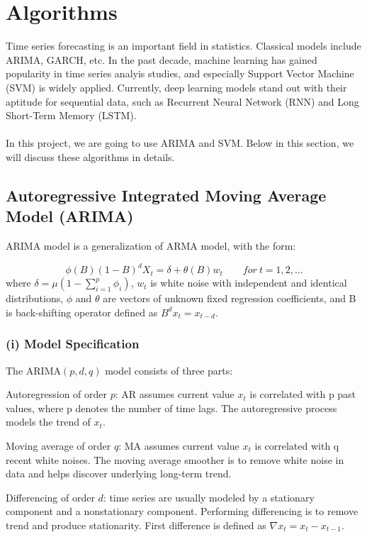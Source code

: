 \documentclass[11pt,a4paper]{article}
\begin{document}
\section{Algorithms}
Time series forecasting is an important field in statistics. Classical models include ARIMA, GARCH, etc. In the past decade, machine learning has gained popularity in time series analyis studies, and especially Support Vector Machine (SVM) is widely applied. Currently, deep learning models stand out with their aptitude for sequential data, such as Recurrent Neural Network (RNN) and Long Short-Term Memory (LSTM).
\\ \\
In this project, we are going to use ARIMA and SVM. Below in this section, we will discuss these algorithms in details.

\subsection*{Autoregressive Integrated Moving Average Model (ARIMA)}
ARIMA model is a generalization of ARMA model, with the form:

$$\phi(B)(1-B)^dX_t=\delta+\theta(B)w_t  \qquad for ~ t = 1,2,…$$
where $\delta = \mu(1-\sum_{i=1}^{p}\phi_i)$, $w_t$ is white noise with independent and identical distributions, $\phi$ and $\theta$ are vectors of unknown fixed regression coefficients, and B is back-shifting operator defined as $B^dx_t=x_{t-d}$.

\subsubsection*{(i) Model Specification}
The ARIMA$(p,d,q)$ model consists of three parts:
\par
Autoregression of order $p$: AR assumes current value $x_t$ is correlated with p past values, where p denotes the number of time lags. The autoregressive process models the trend of $x_t$.
\par
Moving average of order $q$: MA assumes current value $x_t$ is correlated with q recent white noises. The moving average smoother is to remove white noise in data and helps discover underlying long-term trend.
\par
Differencing of order $d$: time series are usually modeled by a stationary component and a nonstationary component. Performing differencing is to remove trend and produce stationarity. First difference is defined as $\nabla x_t=x_t-x_{t-1}$.
\end{document}
